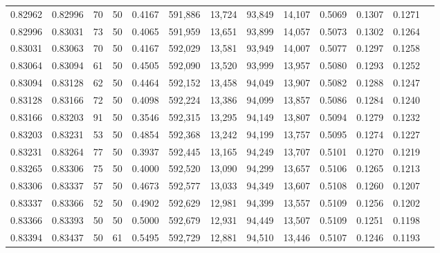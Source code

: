 \begin{tabular}{rrrrrrrrrrrrr}
0.82962 & 0.82996 &    70 &  50 &                                     0.4167 & 591,886 &  13,724 &  93,849 &  14,107 & 0.5069 & 0.1307 & 0.1271 \\
0.82996 & 0.83031 &    73 &  50 &                                     0.4065 & 591,959 &  13,651 &  93,899 &  14,057 & 0.5073 & 0.1302 & 0.1264 \\
0.83031 & 0.83063 &    70 &  50 &                                     0.4167 & 592,029 &  13,581 &  93,949 &  14,007 & 0.5077 & 0.1297 & 0.1258 \\
0.83064 & 0.83094 &    61 &  50 &                                     0.4505 & 592,090 &  13,520 &  93,999 &  13,957 & 0.5080 & 0.1293 & 0.1252 \\
0.83094 & 0.83128 &    62 &  50 &                                     0.4464 & 592,152 &  13,458 &  94,049 &  13,907 & 0.5082 & 0.1288 & 0.1247 \\
0.83128 & 0.83166 &    72 &  50 &                                     0.4098 & 592,224 &  13,386 &  94,099 &  13,857 & 0.5086 & 0.1284 & 0.1240 \\
0.83166 & 0.83203 &    91 &  50 &                                     0.3546 & 592,315 &  13,295 &  94,149 &  13,807 & 0.5094 & 0.1279 & 0.1232 \\
0.83203 & 0.83231 &    53 &  50 &                                     0.4854 & 592,368 &  13,242 &  94,199 &  13,757 & 0.5095 & 0.1274 & 0.1227 \\
0.83231 & 0.83264 &    77 &  50 &                                     0.3937 & 592,445 &  13,165 &  94,249 &  13,707 & 0.5101 & 0.1270 & 0.1219 \\
0.83265 & 0.83306 &    75 &  50 &                                     0.4000 & 592,520 &  13,090 &  94,299 &  13,657 & 0.5106 & 0.1265 & 0.1213 \\
0.83306 & 0.83337 &    57 &  50 &                                     0.4673 & 592,577 &  13,033 &  94,349 &  13,607 & 0.5108 & 0.1260 & 0.1207 \\
0.83337 & 0.83366 &    52 &  50 &                                     0.4902 & 592,629 &  12,981 &  94,399 &  13,557 & 0.5109 & 0.1256 & 0.1202 \\
0.83366 & 0.83393 &    50 &  50 &                                     0.5000 & 592,679 &  12,931 &  94,449 &  13,507 & 0.5109 & 0.1251 & 0.1198 \\
0.83394 & 0.83437 &    50 &  61 &                                     0.5495 & 592,729 &  12,881 &  94,510 &  13,446 & 0.5107 & 0.1246 & 0.1193 \\

\end{tabular}
